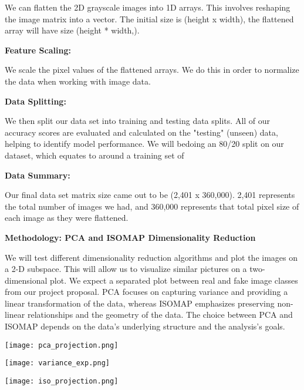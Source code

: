 \documentclass{article}
\begin{document}
\begin{titlepage}
\begin{itemize}
We can flatten the 2D grayscale images into 1D arrays. This involves reshaping the image matrix into a vector. The initial size is (height x width), the flattened array will have size (height * width,).


\textbf{Feature Scaling:}

We scale the pixel values of the flattened arrays. We do this in order to normalize the data when working with image data.

\textbf{Data Splitting:}

We then split our data set into training and testing data splits. All of our accuracy scores are evaluated and calculated on the "testing" (unseen) data, helping to identify model performance. We will bedoing an 80/20 split on our dataset, which equates to around a training set of

\textbf{Data Summary:}

Our final data set matrix size came out to be (2,401 x 360,000). 2,401 represents the total number of images we had, and 360,000 represents that total pixel size of each image as they were flattened.

\newpage


\newpage

\textbf{Methodology: PCA and ISOMAP Dimensionality Reduction}

We will test different dimensionality reduction algorithms and plot the images on a 2-D subspace. This will allow us to visualize similar pictures on a two-dimensional plot. We expect a separated plot between real and fake image classes from our project proposal. PCA focuses on capturing variance and providing a linear transformation of the data, whereas ISOMAP emphasizes preserving non-linear relationships and the geometry of the data. The choice between PCA and ISOMAP depends on the data's underlying structure and the analysis's goals.

\begin{center}
    \texttt{[image: pca\_projection.png]}
\end{center}

\begin{center}
    \texttt{[image: variance\_exp.png]}
\end{center}

\begin{center}
    \texttt{[image: iso\_projection.png]}
\end{center}


\end{itemize}
\end{titlepage}
\end{document}
